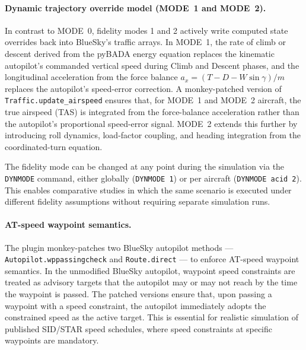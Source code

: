 \paragraph{Dynamic trajectory override model (MODE~1 and MODE~2).}
In contrast to MODE~0, fidelity modes 1 and 2 actively write computed state overrides back into BlueSky's traffic arrays. In MODE~1, the rate of climb or descent derived from the pyBADA energy equation replaces the kinematic autopilot's commanded vertical speed during Climb and Descent phases, and the longitudinal acceleration from the force balance $a_x = (T - D - W \sin\gamma) / m$ replaces the autopilot's speed-error correction. A monkey-patched version of \texttt{Traffic.update\_airspeed} ensures that, for MODE~1 and MODE~2 aircraft, the true airspeed (TAS) is integrated from the force-balance acceleration rather than the autopilot's proportional speed-error signal. MODE~2 extends this further by introducing roll dynamics, load-factor coupling, and heading integration from the coordinated-turn equation.

The fidelity mode can be changed at any point during the simulation via the \texttt{DYNMODE} command, either globally (\texttt{DYNMODE 1}) or per aircraft (\texttt{DYNMODE acid 2}). This enables comparative studies in which the same scenario is executed under different fidelity assumptions without requiring separate simulation runs.

\paragraph{AT-speed waypoint semantics.}
The plugin monkey-patches two BlueSky autopilot methods --- \texttt{Autopilot.wppassingcheck} and \texttt{Route.direct} --- to enforce AT-speed waypoint semantics. In the unmodified BlueSky autopilot, waypoint speed constraints are treated as advisory targets that the autopilot may or may not reach by the time the waypoint is passed. The patched versions ensure that, upon passing a waypoint with a speed constraint, the autopilot immediately adopts the constrained speed as the active target. This is essential for realistic simulation of published SID/STAR speed schedules, where speed constraints at specific waypoints are mandatory.

